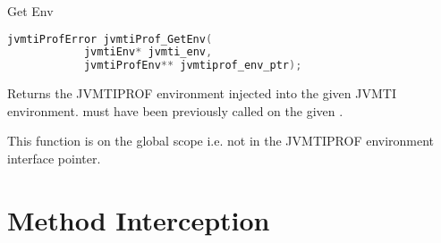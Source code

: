 \begin{apidef}{Get Env}
\begin{lstlisting}[language=C]
jvmtiProfError jvmtiProf_GetEnv(
            jvmtiEnv* jvmti_env,
            jvmtiProfEnv** jvmtiprof_env_ptr);
\end{lstlisting}

\begin{apidesc}
Returns the JVMTIPROF environment injected into the given JVMTI environment.  must have been previously called on the given .

This function is on the global scope i.e. not in the JVMTIPROF environment interface pointer.
\end{apidesc}

\begin{apiphase}
\apiphaseany
\end{apiphase}

\begin{apicap}
\apicaprequired
\end{apicap}

\begin{apiparam}
\end{apiparam}

\apireturnempty

\begin{apierror}
\end{apierror}
\end{apidef}

\section{Method Interception}

